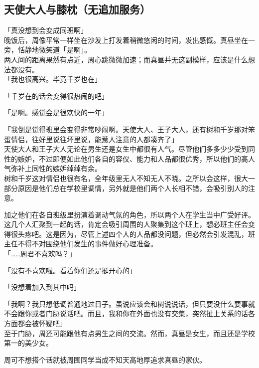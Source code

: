 \subsection{天使大人与膝枕（无追加服务）}

「真没想到会变成同班啊」\\

晚饭后，周像平常一样坐在沙发上打发着稍微悠闲的时间，发出感慨。真昼坐在一旁，恬静地微笑道「是啊」。\\

两人间的距离果然有点近，周心跳微微加速；而真昼并无这副模样，应该是什么想法都没有。\\

「我也很高兴。毕竟千岁也在」

「千岁在的话会变得很热闹的吧」

「是啊。感觉会是很欢快的一年」

「我倒是觉得班里会变得非常吵闹啊。天使大人、王子大人，还有树和千岁那对笨蛋情侣，往好里说往坏里说，能惹人注意的人都凑齐了」\\

天使大人和王子大人无论在男生还是女生中都很有人气。尽管他们多多少少受到同性的嫉妒，不过即便如此他们各自的容仪、能力和人品都很优秀，所以他们的高人气弥补上同性的嫉妒绰绰有余。\\

树和千岁这对情侣也很有名，全年级里无人不知无人不晓。之所以会这样，很大一部分原因是他们总在学校里调情，另外就是他们两个人长相不错，会吸引别人的注意。

加之他们在各自班级里扮演着调动气氛的角色，所以两个人在学生当中广受好评。\\

这几个人汇聚到一起的话，肯定会吸引周围的人聚集到这个班上，想必班主任会变得很头疼吧。这是因为，尽管上述四个人的人品都没问题，但必然会引发混乱，班主任不得不对围绕他们发生的事件做好心理准备。\\

「……周君不喜欢吗？」

「没有不喜欢啦。看着你们还是挺开心的」

「没想着加入到其中吗」

「我啊？我只想低调普通地过日子。虽说应该会和树说说话，但只要没什么要事就不会跟你或者门胁说话吧。而且，我和你在外面也没有交集，突然扯上关系的话各方面都会被怀疑吧」\\

至于门胁，周还可能跟他有点男生之间的交流。然而，真昼是女生，而且还是学校第一的美少女。

周可不想搭个话就被周围同学当成不知天高地厚追求真昼的家伙。\\

